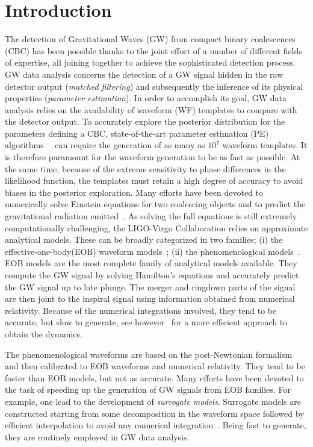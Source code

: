 \section{Introduction}
The detection of Gravitational Waves (GW) from compact binary coalescences (CBC) has been possible thanks to the joint effort of a number of different fields of expertise, all joining together to achieve the sophisticated detection process. GW data analysis concerns the detection of a GW signal hidden in the raw detector output (\textit{matched filtering}) and subsequently the inference of its physical properties (\textit{parameter estimation}). In order to accomplish its goal, GW data analysis relies on the availability of waveform (WF) templates to compare with the detector output.
To accurately explore the posterior distribution for the parameters defining a CBC, state-of-the-art parameter estimation (PE) algorithms~\cite{Aasi:2013jjl}~\cite{Veitch2014wba} can require the generation of as many as $10^7$ waveform templates. It is therefore paramount for the waveform generation to be as fast as possible. At the same time, because of the extreme sensitivity to phase differences in the likelihood  function, 
the templates must retain a high degree of accuracy to avoid biases in the posterior exploration.
Many efforts have been devoted to numerically solve Einstein equations for two coalescing objects and 
to predict the gravitational radiation emitted~\cite{}.
As solving the full equations is still extremely computationally challenging, the LIGO-Virgo Collaboration relies on approximate analytical models. 
These can be broadly categorized in  two families; (i) the effective-one-body(EOB) waveform 
models~\cite{Damour:2009kr,Chiaramello:2020ehz}; (ii) the phenomenological 
models~\cite{Khan:2015jqa,Pratten:2020ceb,Estelles:2020osj}.
%
%
EOB models are the most complete family 
of analytical models available. They compute the GW signal by solving Hamilton's equations 
and accurately predict the GW signal up to late plunge. The merger and ringdown  parts of 
the signal are then joint to the inspiral signal using information obtained from numerical relativity. 
Because of the numerical integrations involved, they tend to be accurate, but slow to generate, 
see however~\cite{Nagar:2018gnk} for a more efficient approach to obtain the dynamics.

The phenomenological waveforms are based on the post-Newtonian formalism and then calibrated 
to  EOB waveforms and numerical relativity. They tend to be faster than EOB models, but not as accurate.
Many efforts have been devoted to the task of speeding up the generation of GW signals from 
EOB families. For example, one lead to the development of \textit{surrogate models}. Surrogate 
models are constructed starting from some decomposition in the waveform space followed by efficient 
interpolation to avoid any  numerical integration~\cite{Purrer:2015tud,Bohe:2016gbl,Purrer:2017str,Lackey:2018zvw,Cotesta:2020qhw}. 
Being fast to generate, they are routinely employed in GW data analysis. 

